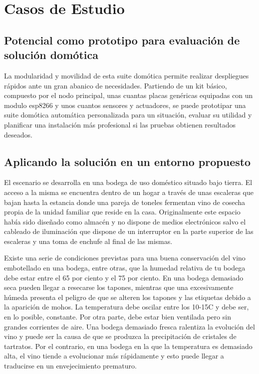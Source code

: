 \cleardoublepage

\chapter{Casos de Estudio}
\label{ch:Capitulo5}

\section{Potencial como prototipo para evaluación de solución domótica}
La modularidad y movilidad de esta suite domótica permite realizar despliegues rápidos ante un gran abanico de necesidades. Partiendo de un kit básico, compuesto por el nodo principal, unas cuantas placas genéricas equipadas con un modulo esp8266 y unos cuantos sensores y actuadores, se puede prototipar una suite domótica automática personalizada para un situación, evaluar su utilidad y planificar una instalación más profesional si las pruebas obtienen resultados deseados.


\section{Aplicando la solución en un entorno propuesto}
\label{ch:Capitulo5.1}
El escenario se desarrolla en una bodega de uso doméstico situado bajo tierra. El acceso a la misma se encuentra dentro de un hogar a través de unas escaleras que bajan hasta la estancia donde una pareja de toneles fermentan vino de cosecha propia de la unidad familiar que reside en la casa. Originalmente este espacio había sido diseñado como almacén y no dispone de medios electrónicos salvo el cableado de iluminación que dispone de un interruptor en la parte superior de las escaleras y una toma de enchufe al final de las mismas.

Existe una serie de condiciones previstas para una buena conservación del vino embotellado en una bodega, entre otras, que la humedad relativa de tu bodega debe estar entre el 65 por ciento y el 75 por ciento. En una bodega demasiado seca pueden llegar a resecarse los tapones, mientras que una excesivamente húmeda presenta el peligro de que se alteren los tapones y las etiquetas debido a la aparición de mohos. La temperatura debe oscilar entre los 10-15C y debe ser, en lo posible, constante. Por otra parte, debe estar bien ventilada pero sin grandes corrientes de aire. Una bodega demasiado fresca ralentiza la evolución del vino y puede ser la causa de que se produzca la precipitación de cristales de tartratos. Por el contrario, en una bodega en la que la temperatura es demasiado alta, el vino tiende a evolucionar más rápidamente y esto puede llegar a traducirse en un envejecimiento prematuro.


